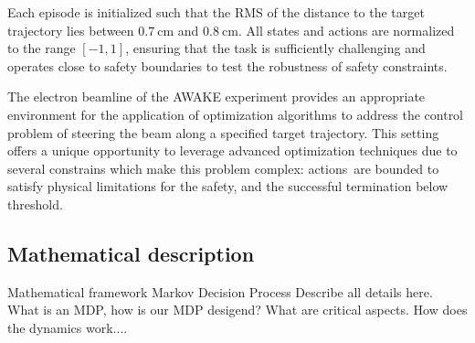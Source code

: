 \documentclass[journal,article,submit,pdftex,moreauthors]{Definitions/mdpi}
\begin{document}
Each episode is initialized such that the RMS of the distance to the target trajectory lies between \(0.7~\text{cm}\) and \(0.8~\text{cm}\). All states and actions are normalized to the range \([-1, 1]\), ensuring that the task is sufficiently challenging and operates close to safety boundaries to test the robustness of safety constraints.


The electron beamline of the AWAKE experiment provides an appropriate environment for the application of optimization algorithms to address the control problem of steering the beam along a specified target trajectory. This setting offers a unique opportunity to leverage advanced optimization techniques due to several constrains which make this problem complex: actions are bounded to satisfy physical limitations for the safety, and the successful termination below threshold. 
\subsection{Mathematical description}
Mathematical framework Markov Decision Process Describe all details here. What is an MDP, how is our MDP desigend? What are critical aspects.
How does the dynamics work....
\end{document}
